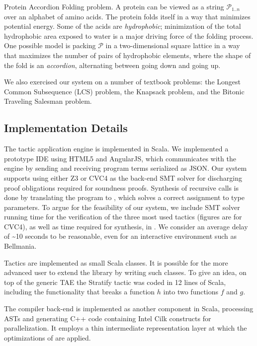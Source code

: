 \begin{paragraph}{Protein Accordion Folding problem.} A protein can be viewed
as a string $\mathcal{P}_{1..n}$ over an alphabet of amino acids. 
The protein folds itself in a way that minimizes potential energy.
Some of the acids are {\em hydrophobic}; minimization of the total hydrophobic
area exposed to water is a major driving force of the folding process.
One possible model is packing $\mathcal{P}$ in a two-dimensional square lattice
in a way that maximizes the number of pairs of hydrophobic elements,
where the shape of the fold is an {\em accordion}, alternating between going down and going
up.
\end{paragraph}

\medskip
We also exercised our system on a number of textbook problems:
the Longest Common Subsequence (LCS) problem, the Knapsack problem,
and the Bitonic Traveling Salesman problem.
\cbdelete{}

\subsection{Implementation Details}
\cbstart{}
The tactic application engine is implemented in Scala. We implemented a prototype
IDE using HTML5 and AngularJS, which communicates with the engine by sending
and receiving program terms serialized as JSON. Our system supports using either
Z3 or CVC4 as the back-end SMT solver for discharging proof obligations required
for soundness proofs. Synthesis of recursive calls is done by translating the
program to \Sketch{}, which solves a correct assignment to type parameters.
To argue for the feasibility of our system, we include
SMT solver running time for the verification of the three most used tactics (figures are for CVC4),
as well as time required for \Sketch{} synthesis, in .
We consider an average delay of \textasciitilde 10 seconds to be reasonable, even for an interactive
environment such as Bellmania.\cbend

Tactics are implemented as small Scala classes. It is possible for
the more advanced user to extend the library by writing such classes.
To give an idea, on top of the generic TAE the {\sf Stratify} tactic was coded in 12 lines of Scala,
including the functionality that breaks a function $h$ into two functions $f$ and $g$.

The compiler back-end is implemented as another component in
\cbstart{}Scala\cbend, processing ASTs and generating C++ code containing Intel Cilk constructs for parallelization.
It employs a thin intermediate representation layer at which the optimizations of  are applied.

